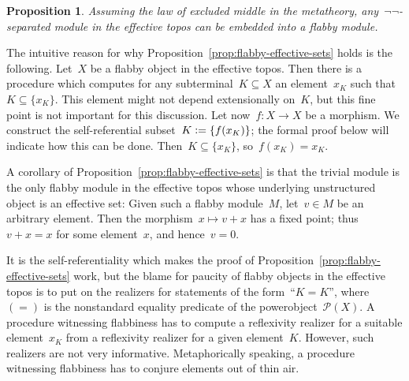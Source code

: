 \documentclass[oneside]{amsart}
\theoremstyle{definition}
\theoremstyle{plain}
\newtheorem{prop}[defn]{Proposition}
\theoremstyle{remark}
\renewcommand{\P}{\mathcal{P}}
\newcommand{\defeq}{\vcentcolon=}
\renewcommand{\_}{\mathpunct{.}\,}
\begin{document}
\begin{prop}\label{prop:semienough-flabby-modules}
Assuming the law of excluded middle in the metatheory, any~$\neg\neg$-separated
module in the effective topos can be embedded into a flabby module.
\end{prop}



The intuitive
reason for why Proposition~\ref{prop:flabby-effective-sets} holds is the
following. Let~$X$ be a flabby object in the effective topos. Then there is a
procedure which computes for any subterminal~$K \subseteq X$ an element~$x_K$
such that~$K \subseteq \{ x_K \}$. This element might not depend extensionally
on~$K$, but this fine point is not important for this discussion. Let
now~$f : X \to X$ be a morphism. We construct the self-referential subset~$K
\defeq \{ f(x_K) \}$; the formal proof below will indicate how this can be
done. Then~$K \subseteq \{ x_K \}$, so~$f(x_K) = x_K$.

A corollary of Proposition~\ref{prop:flabby-effective-sets} is that the trivial
module is the only flabby module in the effective topos whose underlying
unstructured object is an effective set: Given such a flabby module~$M$, let~$v
\in M$ be an arbitrary element. Then the morphism~$x \mapsto v + x$ has a fixed
point; thus~$v + x = x$ for some element~$x$, and hence~$v = 0$.

It is the self-referentiality which makes the proof of
Proposition~\ref{prop:flabby-effective-sets} work, but the blame for paucity
of flabby objects in the effective topos is to put on the realizers for
statements of the form~``$K = K$'', where~$({=})$ is the nonstandard equality
predicate of the powerobject~$\P(X)$. A procedure witnessing flabbiness has to
compute a reflexivity realizer for a suitable element~$x_K$ from a reflexivity
realizer for a given element~$K$. However, such realizers are not very
informative. Metaphorically speaking, a procedure witnessing flabbiness has to
conjure elements out of thin air.
\end{document}
